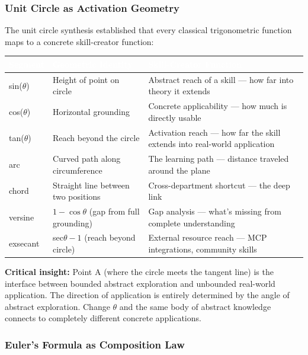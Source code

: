 \documentclass[11pt,letterpaper]{article}
\newcommand{\tableheader}[1]{\textbf{\sffamily\textcolor{white}{#1}}}
\begin{document}
\subsubsection{Unit Circle as Activation Geometry}

The unit circle synthesis established that every classical trigonometric function maps to a
concrete skill-creator function:

\begin{center}
\begin{tabularx}{\textwidth}{L{2cm}L{4cm}X}
\toprule
{}
\tableheader{Segment} & \tableheader{Geometric Identity} & \tableheader{Skill-Creator Function} \\
\midrule
sin($\theta$) & Height of point on circle & Abstract reach of a skill --- how far into theory it extends \\
cos($\theta$) & Horizontal grounding & Concrete applicability --- how much is directly usable \\
tan($\theta$) & Reach beyond the circle & Activation reach --- how far the skill extends into real-world application \\
arc & Curved path along circumference & The learning path --- distance traveled around the plane \\
chord & Straight line between two positions & Cross-department shortcut --- the deep link \\
versine & $1 - \cos\theta$ (gap from full grounding) & Gap analysis --- what's missing from complete understanding \\
exsecant & sec$\theta - 1$ (reach beyond circle) & External resource reach --- MCP integrations, community skills \\
\bottomrule
\end{tabularx}
\end{center}

\textbf{Critical insight:} Point A (where the circle meets the tangent line) is the interface
between bounded abstract exploration and unbounded real-world application. The direction of
application is entirely determined by the angle of abstract exploration. Change $\theta$ and the
same body of abstract knowledge connects to completely different concrete applications.

\subsubsection{Euler's Formula as Composition Law}
\end{document}
